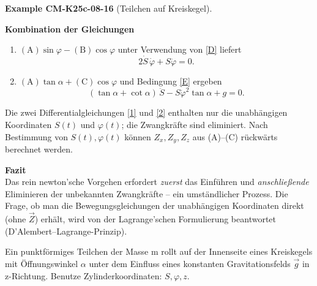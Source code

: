 \documentclass[10pt, letterpaper]{article}
\newcommand{\CustomHeading}[3]{%
  \par\medskip\noindent%
  \textbf{#1 #2} \textnormal{(#3)}.\enskip%
}
\newenvironment{EXA}[2]{\begin{unitbox}\CustomHeading{Example}{#1}{#2}}{\end{unitbox}}
\begin{document}
\begin{EXA}{CM-K25c-08-16}{Teilchen auf Kreiskegel}
\textbf{Kombination der Gleichungen}\\
\begin{enumerate}
  \item[(i)]  $(\text{A})\sin\varphi - (\text{B})\cos\varphi$
              unter Verwendung von \eqref{D} liefert
              \[
                2\dot S\,\dot\varphi + S\ddot\varphi = 0. \tag{1}
              \]
  \item[(ii)] $(\text{A})\tan\alpha + (\text{C})\cos\varphi$
              und Bedingung \eqref{E} ergeben
              \[
                (\tan\alpha + \cot\alpha)\,\ddot S
                - S\dot\varphi^{2}\tan\alpha + g = 0. \tag{2}
              \]
\end{enumerate}
Die zwei Differential­gleichungen \eqref{1} und \eqref{2} enthalten nur
die unabhängigen Koordinaten $S(t)$ und $\varphi(t)$;
die Zwangkräfte sind eliminiert.  
Nach Bestimmung von $S(t),\varphi(t)$ können $Z_x,Z_y,Z_z$ aus
(A)–(C) rückwärts berechnet werden.

\textbf{Fazit}\\
Das rein newton’sche Vorgehen erfordert
\emph{zuerst} das Einführen und
\emph{anschließende} Eliminieren der unbekannten Zwangkräfte – ein
umständlicher Prozess.  
Die Frage, ob man die Bewegungsgleichungen der unabhängigen Koordinaten
direkt (ohne $\vec Z$) erhält, wird von der Lagrange’schen Formulierung
beantwortet (D’Alembert–Lagrange-Prinzip).
\end{EXA}












\begin{center}
\end{center}

Ein punktförmiges Teilchen der Masse m rollt auf der Innenseite eines Kreiskegels mit Öffnungswinkel $\alpha$ unter dem Einfluss eines konstanten Gravitationsfelds $\vec{g}$ in z-Richtung. Benutze Zylinderkoordinaten: $S,\varphi,z$.
\end{document}
